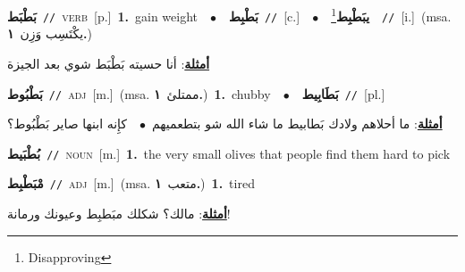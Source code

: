 \documentclass[10pt,a4paper,twoside]{article} %
\begin{document}
\begin{multicols}{2}
{\setlength\topsep{0pt}\textbf{\foreignlanguage{arabic}{بَطْبَط}}\ {\color{gray}\texttt{//}\color{black}}\ \textsc{verb}\ [p.]\ \textbf{1.}~gain weight\ \ $\bullet$\ \ \setlength\topsep{0pt}\textbf{\foreignlanguage{arabic}{بَطْبِط}}\ {\color{gray}\texttt{//}\color{black}}\ [c.]\ \ $\bullet$\ \ \setlength\topsep{0pt}\textbf{\foreignlanguage{arabic}{يبَطْبِط}}\footnote{Disapproving}\ \ {\color{gray}\texttt{//}\color{black}}\ [i.]\ \color{gray}(msa. \foreignlanguage{arabic}{يكْتَسِب وَزِن}~\foreignlanguage{arabic}{\textbf{١.}})\color{black}\  \begin{flushright}\color{gray}\foreignlanguage{arabic}{\textbf{\underline{\foreignlanguage{arabic}{أمثلة}}}: أنا حسيته بَطْبَط شوي بعد الجيزة}\end{flushright}\color{black}} \vspace{2mm}

{\setlength\topsep{0pt}\textbf{\foreignlanguage{arabic}{بَطْبُوط}}\ {\color{gray}\texttt{//}\color{black}}\ \textsc{adj}\ [m.]\ \color{gray}(msa. \foreignlanguage{arabic}{ممتلئ}~\foreignlanguage{arabic}{\textbf{١.}})\color{black}\ \textbf{1.}~chubby\ \ $\bullet$\ \ \setlength\topsep{0pt}\textbf{\foreignlanguage{arabic}{بَطَابِيط}}\ {\color{gray}\texttt{//}\color{black}}\ [pl.]\  \begin{flushright}\color{gray}\foreignlanguage{arabic}{\textbf{\underline{\foreignlanguage{arabic}{أمثلة}}}: ما أحلاهم ولادك بَطابيط ما شاء الله شو بتطعميهم\ $\bullet$\ \  كإِنه ابنها صاير بَطْبُوط؟}\end{flushright}\color{black}} \vspace{2mm}

{\setlength\topsep{0pt}\textbf{\foreignlanguage{arabic}{بُطْبَيط}}\ {\color{gray}\texttt{//}\color{black}}\ \textsc{noun}\ [m.]\ \textbf{1.}~the very small olives that people find them hard to pick\ } \vspace{2mm}

{\setlength\topsep{0pt}\textbf{\foreignlanguage{arabic}{مْبَطْبِط}}\ {\color{gray}\texttt{//}\color{black}}\ \textsc{adj}\ [m.]\ \color{gray}(msa. \foreignlanguage{arabic}{متعب}~\foreignlanguage{arabic}{\textbf{١.}})\color{black}\ \textbf{1.}~tired\  \begin{flushright}\color{gray}\foreignlanguage{arabic}{\textbf{\underline{\foreignlanguage{arabic}{أمثلة}}}: مالك؟ شكلك مبَطبِط وعيونك ورمانة!}\end{flushright}\color{black}} \vspace{2mm}


\end{multicols}
\end{document}

